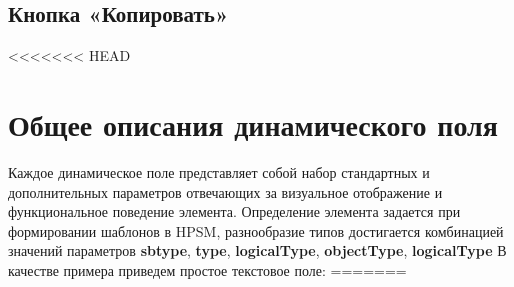 \documentclass[../index.tex]{subfiles}
\begin{document}
\subsection{Кнопка «Копировать»}


<<<<<<< HEAD
\section{Общее описания динамического поля}
    Каждое динамическое поле представляет собой набор стандартных и дополнительных параметров отвечающих за визуальное отображение и функциональное поведение элемента.
    Определение элемента задается при формировании шаблонов в HPSM, разнообразие типов достигается комбинацией значений параметров \textbf{sbtype}, \textbf{type}, \textbf{logicalType}, \textbf{objectType}, \textbf{logicalType}
    В качестве примера приведем простое текстовое поле:
=======
\end{document}
